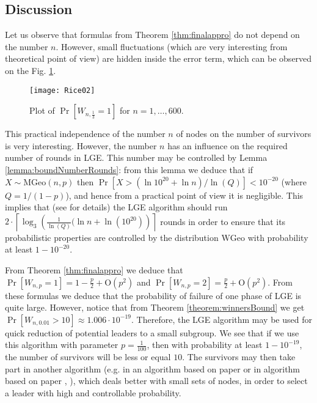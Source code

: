 \documentclass[proceedings]{dmtcs}
\newcommand{\MGeo}[2]{\mathrm{MGeo}(#1,#2)}
\newcommand{\BigO}[1]{\mathrm{O}\left(#1\right)}
\begin{document}
\subsection{Discussion}

Let us observe that formulas from Theorem \ref{thm:finalappro} do not depend on the number $n$. 
However, small fluctuations (which are very interesting from theoretical point of view) are hidden inside the error term, which can be observed on the Fig. \ref{fig:onewinner}.  

\begin{figure}[ht]
\label{fig:onewinner}
\centering
\texttt{[image: Rice02]}
\caption{Plot of $\Pr[W_{n,\frac13}=1]$ for $n=1,\ldots,600$.}
\end{figure}

This  practical independence of the number $n$ of nodes on the number of survivors is very interesting. 
However, the number $n$ has an influence on the required number of rounds in LGE.
This number may be controlled by Lemma 
\ref{lemma:boundNumberRounds}:  from this lemma we deduce that if 
$X \sim \MGeo{n}{p}$ then $\Pr[X > (\ln 10^{20} + \ln n)/\ln(Q)] < 10^{-20}$ (where $Q = 1/(1-p)$), 
and hence from a practical point of view it is negligible.
This implies that (see \cite{DBLP:conf/mascots/JacquetMM13} for details) the LGE algorithm should run
$2 \cdot \left\lceil \log_3 \left(\frac{1}{\ln(Q)}(\ln n+  \ln(10^{20})\right)\right\rceil$ rounds in order 
to ensure that its probabilistic properties are controlled by the distribution $\mathrm{WGeo}$ with probability at least
$1-10^{-20}$.



From Theorem \ref{thm:finalappro} we  deduce that $\Pr[W_{n,p}=1]= 1- \frac{p}{2} + \BigO{p^2}$
and $\Pr[W_{n,p}=2]= \frac{p}{2} + \BigO{p^2}$.
From these formulas we deduce that the probability of failure of one phase of LGE is quite large. However, notice
that from Theorem \ref{theorem:winnersBound} we get 
$\Pr[W_{n,0.01}>10] \approx 1.006 \cdot 10^{-19}$.
Therefore, the LGE algorithm may be used for quick reduction of potential leaders to a small subgroup. 
We see that if we use this algorithm with parameter $p = \frac{1}{100}$, then with
probability at least $1- 10^{-19}$, the number of survivors will be less or equal  $10$.
The survivors may then take part in another algorithm (e.g. in an algorithm based on paper 
\cite{DBLP:journals/dm/Prodinger93} 
or in algorithm based on paper \cite{DBLP:journals/combinatorics/JansonS97}, \cite{GLandHP2009}), 
which deals better with small sets of nodes,  in order to select a leader with high and controllable 
probability.
\end{document}
